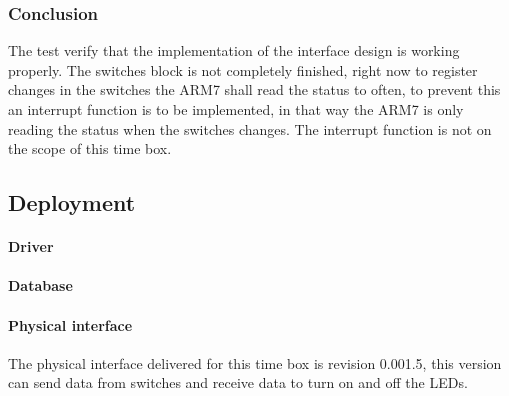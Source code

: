\subsubsection{Conclusion}
The test verify that the implementation of the interface design is working properly. The switches block is not completely finished, right now to register changes in the switches the ARM7 shall read the status to often, to prevent this an interrupt function is to be implemented, in that way the ARM7 is only reading the status when the switches changes. The interrupt function is not on the scope of this time box.
\subsection{Deployment}
\paragraph{Driver}
\paragraph{Database}
\paragraph{Physical interface}
	The physical interface delivered for this time box is revision 0.001.5, this version can send data from switches and receive data to turn on and off the LEDs.
